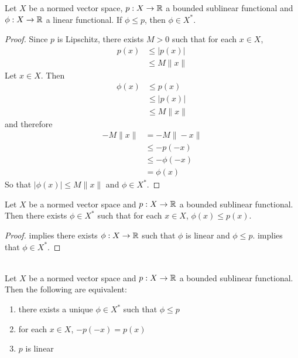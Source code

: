 \documentclass{book}
\begin{document}
	\begin{ex} 
	Let $X$ be a normed vector space, $p:X \rightarrow \mathbb{R}$ a bounded sublinear functional and $\phi:X \rightarrow \mathbb{R}$ a linear functional. If $\phi \leq p$, then $\phi \in X^*$. 
	\end{ex}
	
	\begin{proof}
	Since $p$ is Lipschitz, there exists $M >0$ such that for each $x \in X$, 
	\begin{align*}
	p(x) 
	&\leq |p(x)| \\
	&\leq M \|x\|
	\end{align*}
	Let $x \in X$. Then 
	\begin{align*}
	\phi(x) 
	&\leq p(x) \\
	&\leq |p(x)| \\
	&\leq M \|x\| 
	\end{align*}
	and therefore  
	\begin{align*}
	- M \|x\| 
	&= -M \|-x\| \\
	& \leq -p(-x) \\
	& \leq - \phi(-x) \\
	&= \phi(x) 
	\end{align*}
	So that $|\phi(x)| \leq  M\|x\|$ and $\phi \in X^*$.
	\end{proof}
	
	\begin{ex} 
	Let $X$ be a normed vector space and $p:X \rightarrow \mathbb{R}$ a bounded sublinear functional. Then there exists $\phi \in X^*$ such that for each $x \in X$, $\phi(x) \leq p(x)$.
	\end{ex}
	
	\begin{proof}
	 implies there exists $\phi: X \rightarrow \mathbb{R}$ such that $\phi$ is linear and $\phi \leq p$.  implies that $\phi \in X^*$.
	\end{proof}
	
	\begin{ex}  \\
	Let $X$ be a normed vector space and $p:X \rightarrow \mathbb{R}$ a bounded sublinear functional. Then the following are equivalent:
	\begin{enumerate}
	\item there exists a unique $\phi \in X^*$ such that $\phi \leq p$
	\item for each $x \in X$, $-p(-x) = p(x)$
	\item $p$ is linear
\end{enumerate}	
	\end{ex}
	
\end{document}
